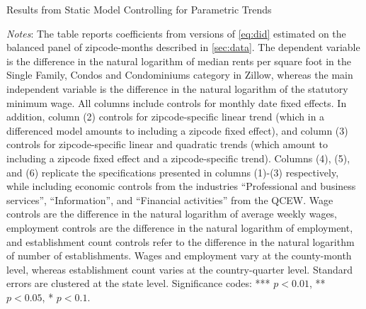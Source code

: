 \clearpage
\begin{table}[h!]
	\caption{Results from Static Model Controlling for Parametric Trends}
	\label{tab:did_trend}
	\centering
	\resizebox{\textwidth}{!}{
	
	}
	\begin{minipage}{0.95\textwidth} \footnotesize
		\vspace{3mm} 
		\textit{Notes}: The table reports coefficients from versions of \autoref{eq:did} 
		estimated on the balanced panel of zipcode-months described in \autoref{sec:data}. 
		The dependent variable is the difference in the natural logarithm of median	rents 
		per	square foot in the Single Family, Condos and Condominiums category in Zillow, 
		whereas the main independent variable is the difference in the natural logarithm
		of the statutory minimum wage. All columns include controls for monthly date fixed 
		effects. In addition, column (2) controls for zipcode-specific linear trend (which 
		in a differenced model amounts to including a zipcode fixed effect), and column (3) 
		controls for zipcode-specific linear and quadratic trends (which amount to including 
		a zipcode fixed effect and a zipcode-specific trend). Columns (4), (5), and (6) replicate
		the specifications presented in columns (1)-(3) respectively, while including 
		economic controls from the industries ``Professional and business services'', 
		``Information'', and ``Financial activities'' from the QCEW. Wage controls are 
		the difference in the natural logarithm of average weekly wages, employment 
		controls are the difference in the natural logarithm of employment, and 
		establishment count controls refer to the difference in the natural logarithm 
		of number of establishments. Wages and employment vary at the county-month level,
		whereas establishment count varies at the country-quarter level.
		Standard errors are clustered 
		at the state level. Significance codes: *** $p < 0.01$, ** $p < 0.05$, * $p < 0.1$.
	\end{minipage}
\end{table}

